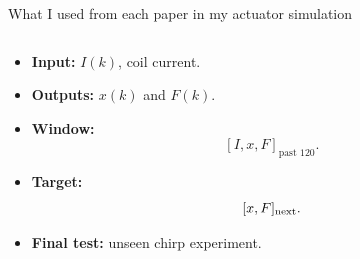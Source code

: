 \documentclass[aspectratio=169,10pt]{beamer}
\begin{document}
\begin{frame}{What I used from each paper in my actuator simulation}
\begin{columns}[T,onlytextwidth]
\begin{column}{0.32\textwidth}
\begin{tcolorbox}[
enhanced,
colback=LightGray,
colframe=Accent,
colbacktitle=Accent,
coltitle=white,
title=\textbf{My final setup},
fonttitle=\small\bfseries,
boxrule=0.8pt,
arc=2mm,
left=2mm,right=2mm,top=1.5mm,bottom=1.5mm,
height=0.66\textheight
]
\begin{itemize}\itemsep4pt
\item \textbf{Input:} $I(k)$, coil current.
\item \textbf{Outputs:} $x(k)$ and $F(k)$.
\item \textbf{Window:}
\[
[I,x,F]_{\text{past }120}.
\]
\item \textbf{Target:}
\[
[x,F]_{\rm next}.
\]
\item \textbf{Final test:} unseen chirp experiment.
\end{itemize}
\end{tcolorbox}
\end{column}

\end{columns}
\end{frame}
\end{document}
